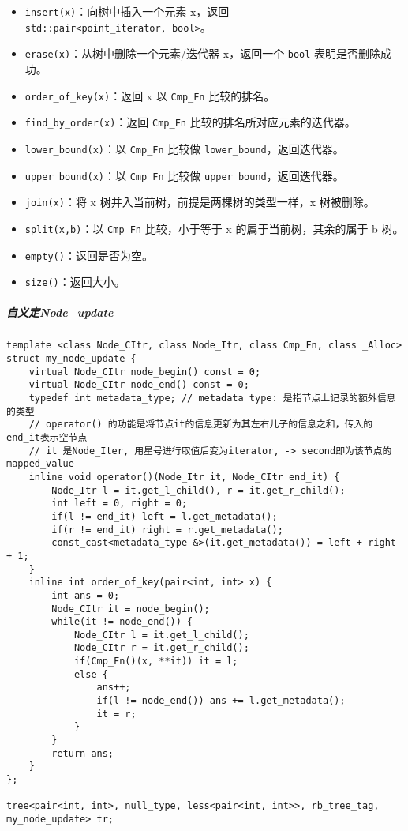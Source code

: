 \documentclass[]{article}
\providecommand{\tightlist}{%
  \setlength{\itemsep}{0pt}\setlength{\parskip}{0pt}}
\let\oldsubparagraph\subparagraph
\renewcommand{\subparagraph}[1]{\oldsubparagraph{#1}\mbox{}}
\begin{document}
\begin{itemize}
\tightlist
\item
  \texttt{insert(x)}：向树中插入一个元素 x，返回
  \texttt{std::pair\textless{}point\_iterator,\ bool\textgreater{}}。
\item
  \texttt{erase(x)}：从树中删除一个元素/迭代器 x，返回一个 \texttt{bool}
  表明是否删除成功。
\item
  \texttt{order\_of\_key(x)}：返回 x 以 \texttt{Cmp\_Fn} 比较的排名。
\item
  \texttt{find\_by\_order(x)}：返回 \texttt{Cmp\_Fn}
  比较的排名所对应元素的迭代器。
\item
  \texttt{lower\_bound(x)}：以 \texttt{Cmp\_Fn} 比较做
  \texttt{lower\_bound}，返回迭代器。
\item
  \texttt{upper\_bound(x)}：以 \texttt{Cmp\_Fn} 比较做
  \texttt{upper\_bound}，返回迭代器。
\item
  \texttt{join(x)}：将 x 树并入当前树，前提是两棵树的类型一样，x
  树被删除。
\item
  \texttt{split(x,b)}：以 \texttt{Cmp\_Fn} 比较，小于等于 x
  的属于当前树，其余的属于 b 树。
\item
  \texttt{empty()}：返回是否为空。
\item
  \texttt{size()}：返回大小。
\end{itemize}

\hypertarget{ux81eaux4e49ux5b9anode_update}{%
\subparagraph{自义定Node\_update}\label{ux81eaux4e49ux5b9anode_update}}

\begin{verbatim}
template <class Node_CItr, class Node_Itr, class Cmp_Fn, class _Alloc>
struct my_node_update { 
    virtual Node_CItr node_begin() const = 0;
    virtual Node_CItr node_end() const = 0;
    typedef int metadata_type; // metadata type: 是指节点上记录的额外信息的类型
    // operator() 的功能是将节点it的信息更新为其左右儿子的信息之和，传入的end_it表示空节点
    // it 是Node_Iter, 用星号进行取值后变为iterator, -> second即为该节点的mapped_value
    inline void operator()(Node_Itr it, Node_CItr end_it) {
        Node_Itr l = it.get_l_child(), r = it.get_r_child();
        int left = 0, right = 0;
        if(l != end_it) left = l.get_metadata();
        if(r != end_it) right = r.get_metadata();
        const_cast<metadata_type &>(it.get_metadata()) = left + right + 1;
    }
    inline int order_of_key(pair<int, int> x) {
        int ans = 0;
        Node_CItr it = node_begin();
        while(it != node_end()) {
            Node_CItr l = it.get_l_child();
            Node_CItr r = it.get_r_child();
            if(Cmp_Fn()(x, **it)) it = l;
            else {
                ans++;
                if(l != node_end()) ans += l.get_metadata();
                it = r;
            }
        }
        return ans;
    }
};

tree<pair<int, int>, null_type, less<pair<int, int>>, rb_tree_tag, my_node_update> tr;
\end{verbatim}
\end{document}
